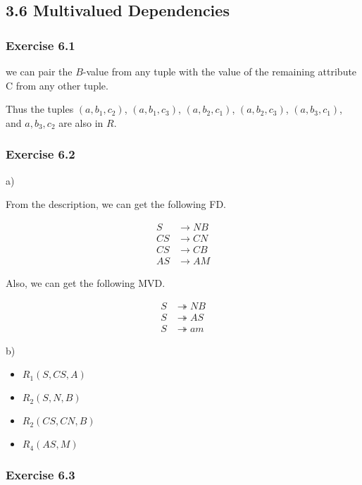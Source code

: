 \documentclass[../../main.tex]{subfiles}
\begin{document}
\subsection{3.6 Multivalued Dependencies}

\subsubsection*{Exercise 6.1}

we can pair the $B$-value from any tuple with the
value of the remaining attribute C from any other
tuple.

Thus the tuples $(a, b_{1}, c_{2})$, $(a, b_{1}, c_{3})$,
$(a, b_{2}, c_{1})$, $(a, b_{2}, c_{3})$, $(a, b_{3}, c_{1})$,
and $a, b_{3}, c_{2}$ are also in $R$.

\subsubsection*{Exercise 6.2}

a)

From the description, we can get the following FD.

\begin{align*}
  S & \to NB \\
  CS & \to CN \\
  CS & \to CB \\
  AS & \to AM
\end{align*}

Also, we can get the following MVD.

\begin{align*}
  S & \twoheadrightarrow NB \\
  S & \twoheadrightarrow AS \\
  S & \twoheadrightarrow am
\end{align*}

b)

\begin{itemize}
  \item $R_{1}(S, CS, A)$
  \item $R_{2}(S,N,B)$
  \item $R_{2}(CS,CN,B)$
  \item $R_{4}(AS, M)$
\end{itemize}

\subsubsection*{Exercise 6.3}
\end{document}
